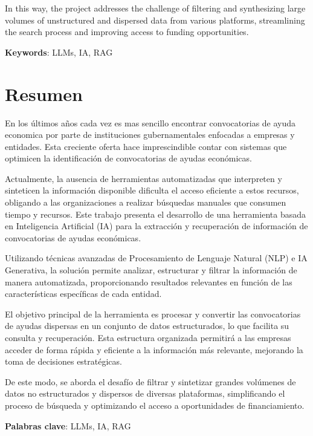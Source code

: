 In this way, the project addresses the challenge of filtering and synthesizing large volumes of unstructured and dispersed data from various platforms, streamlining the search process and improving access to funding opportunities.

\vspace{1.5cm}

\textbf{Keywords}: LLMs, IA, RAG

\chapter*{Resumen}

\onehalfspacing

En los últimos años cada vez es mas sencillo encontrar convocatorias de ayuda economica por parte de instituciones gubernamentales enfocadas a empresas y entidades. Esta creciente oferta hace imprescindible contar con sistemas que optimicen la identificación de convocatorias de ayudas económicas. 

Actualmente, la ausencia de herramientas automatizadas que interpreten y sinteticen la información disponible dificulta el acceso eficiente a estos recursos, obligando a las organizaciones a realizar búsquedas manuales que consumen tiempo y recursos.
Este trabajo presenta el desarrollo de una herramienta basada en Inteligencia Artificial (IA) para la extracción y recuperación de información de convocatorias de ayudas económicas.

Utilizando técnicas avanzadas de Procesamiento de Lenguaje Natural (NLP) e IA Generativa, la solución permite analizar, estructurar y filtrar la información de manera automatizada, proporcionando resultados relevantes en función de las características específicas de cada entidad.

El objetivo principal de la herramienta es procesar y convertir las convocatorias de ayudas dispersas en un conjunto de datos estructurados, lo que facilita su consulta y recuperación. Esta estructura organizada permitirá a las empresas acceder de forma rápida y eficiente a la información más relevante, mejorando la toma de decisiones estratégicas. 

De este modo, se aborda el desafío de filtrar y sintetizar grandes volúmenes de datos no estructurados y dispersos de diversas plataformas, simplificando el proceso de búsqueda y optimizando el acceso a oportunidades de financiamiento.

\vspace{1.5cm}

\textbf{Palabras clave}: LLMs, IA, RAG